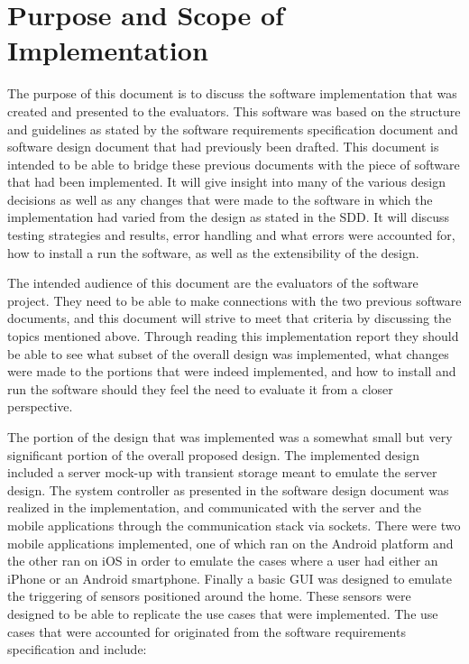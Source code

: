 \documentclass{article}
\begin{document}
\lstset{language=sh,
        frame=single,
        breaklines=true,
        basicstyle=\small\ttfamily,
        columns=fullflexible}



\tableofcontents
\listoffigures
\lstlistoflistings

\section{Purpose and Scope of Implementation} %


The purpose of this document is to discuss the software implementation that was
created and presented to the evaluators. This software was based on the structure
and guidelines as stated by the software requirements specification document and
software design document that had previously been drafted. This document is
intended to be able to bridge these previous documents with the piece of software
that had been implemented. It will give insight into many of the various design
decisions as well as any changes that were made to the software in which the
implementation had varied from the design as stated in the SDD. It will discuss
testing strategies and results, error handling and what errors were accounted
for, how to install a run the software, as well as the extensibility of the design.

The intended audience of this document are the evaluators of the software project.
They need to be able to make connections with the two previous software documents,
and this document will strive to meet that criteria by discussing the topics mentioned
above. Through reading this implementation report they should be able to see
what subset of the overall design was implemented, what changes were made to
the portions that were indeed implemented, and how to install and run the software
should they feel the need to evaluate it from a closer perspective.

The portion of the design that was implemented was a somewhat small but very
significant portion of the overall proposed design. The implemented design
included a server mock-up with transient storage meant to emulate the server
design. The system controller as presented in the software design document was
realized in the implementation, and communicated with the server and the mobile
applications through the communication stack via sockets. There were two mobile
applications implemented, one of which ran on the Android platform and the other
ran on iOS in order to emulate the cases where a user had either an iPhone or an
Android smartphone. Finally a basic GUI was designed to emulate the triggering
of sensors positioned around the home. These sensors were designed to be able
to replicate the use cases that were implemented. The use cases that were
accounted for originated from the software requirements specification and include:
\end{document}
